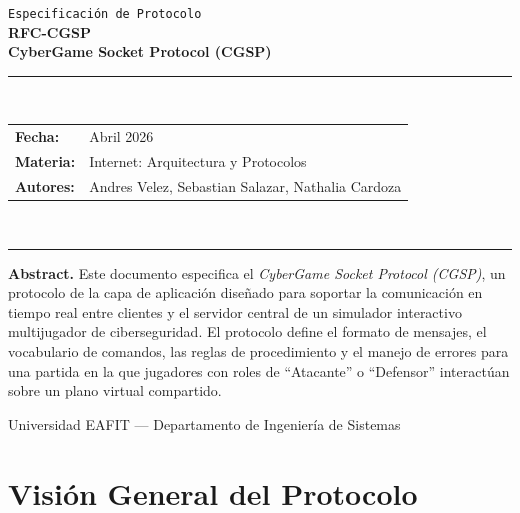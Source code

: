 \documentclass[12pt, letterpaper]{article}
\begin{document}
\begin{titlepage}
    \centering
    \vspace*{1cm}

    {\small\texttt{Especificación de Protocolo}}\\[0.3cm]
    {\Huge\bfseries\color{cgsp-blue} RFC-CGSP}\\[0.5cm]
    {\large\bfseries CyberGame Socket Protocol (CGSP)}

    \vspace{1.5cm}
    \rule{\textwidth}{1pt}\\[0.4cm]
    {\normalsize
        \begin{tabular}{ll}
            \textbf{Fecha:}    & Abril 2026 \\[4pt]
            \textbf{Materia:}  & Internet: Arquitectura y Protocolos \\[4pt]
            \textbf{Autores:}  & Andres Velez, Sebastian Salazar, Nathalia Cardoza
        \end{tabular}
    }\\[0.4cm]
    \rule{\textwidth}{1pt}

    \vspace{1.5cm}
    \begin{mdframed}[backgroundcolor=cgsp-gray, linecolor=cgsp-blue, linewidth=1pt]
        \textbf{Abstract.} Este documento especifica el \textit{CyberGame Socket Protocol
        (CGSP)}, un protocolo de la capa de aplicación diseñado para soportar la
        comunicación en tiempo real entre clientes y el servidor central de un simulador
        interactivo multijugador de ciberseguridad. El protocolo define el formato de
        mensajes, el vocabulario de comandos, las reglas de procedimiento y el manejo de
        errores para una partida en la que jugadores con roles de ``Atacante'' o
        ``Defensor'' interactúan sobre un plano virtual compartido.
    \end{mdframed}

    \vfill
    {\small Universidad EAFIT --- Departamento de Ingeniería de Sistemas}
\end{titlepage}

\tableofcontents
\newpage

\section{Visión General del Protocolo}
\end{document}
